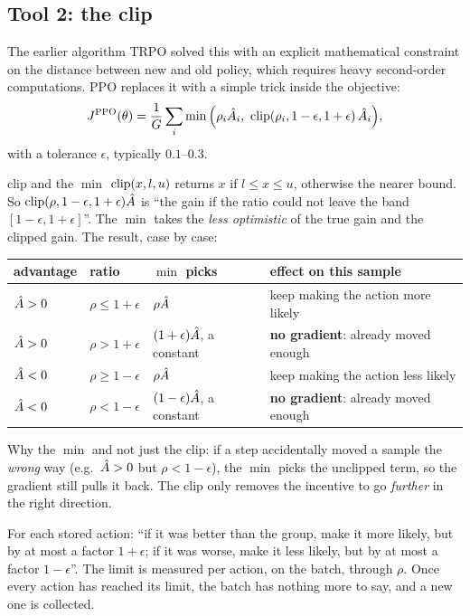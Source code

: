 \subsection{Tool 2: the clip}
The earlier algorithm TRPO solved this with an explicit mathematical constraint on the distance between new and old policy, which requires heavy second-order computations. PPO replaces it with a simple trick inside the objective:
\begin{equation}
J^{\mathrm{PPO}}(\theta)=\frac1G\sum_i\min\Big(\rho_i\Ah_i,\ \clip(\rho_i,1-\epsilon,1+\epsilon)\,\Ah_i\Big),
\label{fpo:eq:ppo}
\end{equation}
with a tolerance $\epsilon$, typically $0.1$--$0.3$.
\begin{newc}{clip and the $\min$}
$\operatorname{clip}(x,l,u)$ returns $x$ if $l\le x\le u$, otherwise the nearer bound. So $\operatorname{clip}(\rho,1-\epsilon,1+\epsilon)\hat A$ is ``the gain if the ratio could not leave the band $[1-\epsilon,1+\epsilon]$''. The $\min$ takes the \emph{less optimistic} of the true gain and the clipped gain. The result, case by case:
\begin{center}
\small
\begin{tabular}{@{}llll@{}}
\toprule
advantage & ratio & $\min$ picks & effect on this sample\\
\midrule
$\hat A>0$ & $\rho\le1+\epsilon$ & $\rho\hat A$ & keep making the action more likely\\
$\hat A>0$ & $\rho>1+\epsilon$ & $(1+\epsilon)\hat A$, a constant & \textbf{no gradient}: already moved enough\\
$\hat A<0$ & $\rho\ge1-\epsilon$ & $\rho\hat A$ & keep making the action less likely\\
$\hat A<0$ & $\rho<1-\epsilon$ & $(1-\epsilon)\hat A$, a constant & \textbf{no gradient}: already moved enough\\
\bottomrule
\end{tabular}
\end{center}
Why the $\min$ and not just the clip: if a step accidentally moved a sample the \emph{wrong} way (e.g.\ $\hat A>0$ but $\rho<1-\epsilon$), the $\min$ picks the unclipped term, so the gradient still pulls it back. The clip only removes the incentive to go \emph{further} in the right direction.
\end{newc}

\begin{intuition}
For each stored action: ``if it was better than the group, make it more likely, but by at most a factor $1+\epsilon$; if it was worse, make it less likely, but by at most a factor $1-\epsilon$''. The limit is measured per action, on the batch, through $\rho$. Once every action has reached its limit, the batch has nothing more to say, and a new one is collected.
\end{intuition}

